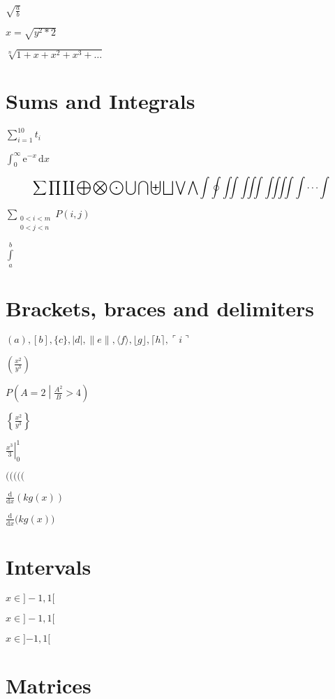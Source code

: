 \documentclass{article}
\begin{document}
$\sqrt{\frac{a}{b}}$

\(x=\sqrt{y^2*2}\)

$\sqrt[n]{1+x+x^2+x^3+\ldots}$


\section{Sums and Integrals}

$\sum_{i=1}^{10} t_i$

$\int_0^\infty \mathrm{e}^{-x}\,\mathrm{d}x$


\begin{equation}\sum  \prod  \coprod 
\bigoplus	\bigotimes	\bigodot
\bigcup		\bigcap		\biguplus
\bigsqcup		\bigvee		\bigwedge
\int		\oint		\iint
\iiint		\iiiint		\idotsint 
\end{equation}

$\sum_{\substack{
   0<i<m \\
   0<j<n
  }}
 P(i,j)$
 
$\int\limits_a^b$
 
\section{Brackets, braces and delimiters}


$
( a ), [ b ], \{ c \}, | d |, \| e \|,
\langle f \rangle, \lfloor g \rfloor,
\lceil h \rceil, \ulcorner i \urcorner
$

$\left(\frac{x^2}{y^3}\right)$

$P\left(A=2\middle|\frac{A^2}{B}>4\right)$

$\left\{\frac{x^2}{y^3}\right\}$

$\left.\frac{x^3}{3}\right|_0^1$

$( \big( \Big( \bigg( \Bigg($

$\frac{\mathrm d}{\mathrm d x} \left( k g(x) \right)$

$\frac{\mathrm d}{\mathrm d x} \big( k g(x) \big)$

\section{Intervals}

$x \in ]-1,1[$

$x \in {]-1,1[}$

$x \in {]{-1},1[}$



\section{Matrices}
\end{document}
